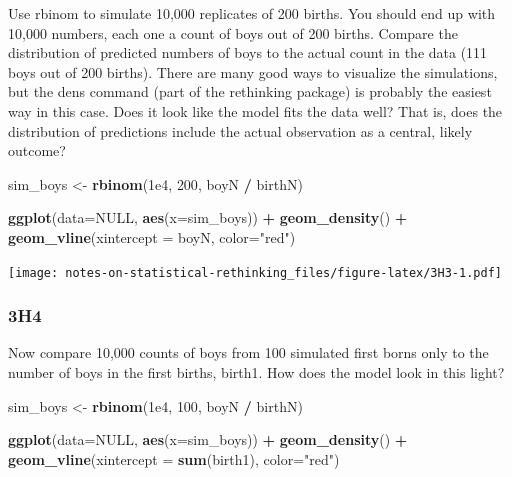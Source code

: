 \documentclass[
]{book}
\newenvironment{Shaded}{\begin{snugshade}}{\end{snugshade}}
\newcommand{\DataTypeTok}[1]{\textcolor[rgb]{0.13,0.29,0.53}{#1}}
\newcommand{\DecValTok}[1]{\textcolor[rgb]{0.00,0.00,0.81}{#1}}
\newcommand{\FloatTok}[1]{\textcolor[rgb]{0.00,0.00,0.81}{#1}}
\newcommand{\KeywordTok}[1]{\textcolor[rgb]{0.13,0.29,0.53}{\textbf{#1}}}
\newcommand{\NormalTok}[1]{#1}
\newcommand{\OperatorTok}[1]{\textcolor[rgb]{0.81,0.36,0.00}{\textbf{#1}}}
\newcommand{\OtherTok}[1]{\textcolor[rgb]{0.56,0.35,0.01}{#1}}
\newcommand{\StringTok}[1]{\textcolor[rgb]{0.31,0.60,0.02}{#1}}
\begin{document}
Use rbinom to simulate 10,000 replicates of 200 births. You should end up with 10,000 numbers, each one a count of boys out of 200 births. Compare the distribution of predicted numbers of boys to the actual count in the data (111 boys out of 200 births). There are many good ways to visualize the simulations, but the dens command (part of the rethinking package) is probably the easiest way in this case. Does it look like the model fits the data well? That is, does the distribution of predictions include the actual observation as a central, likely outcome?

\begin{Shaded}
\begin{Highlighting}[]
\NormalTok{sim\_boys \textless{}{-}}\StringTok{ }\KeywordTok{rbinom}\NormalTok{(}\FloatTok{1e4}\NormalTok{, }\DecValTok{200}\NormalTok{, boyN }\OperatorTok{/}\StringTok{ }\NormalTok{birthN)}

\KeywordTok{ggplot}\NormalTok{(}\DataTypeTok{data=}\OtherTok{NULL}\NormalTok{, }\KeywordTok{aes}\NormalTok{(}\DataTypeTok{x=}\NormalTok{sim\_boys)) }\OperatorTok{+}\StringTok{ }
\StringTok{  }\KeywordTok{geom\_density}\NormalTok{() }\OperatorTok{+}\StringTok{ }
\StringTok{  }\KeywordTok{geom\_vline}\NormalTok{(}\DataTypeTok{xintercept =}\NormalTok{ boyN, }\DataTypeTok{color=}\StringTok{"red"}\NormalTok{)}
\end{Highlighting}
\end{Shaded}

\texttt{[image: notes-on-statistical-rethinking\_files/figure-latex/3H3-1.pdf]}

\hypertarget{h4-1}{%
\subsubsection*{3H4}\label{h4-1}}

Now compare 10,000 counts of boys from 100 simulated first borns only to the number of boys in the first births, birth1. How does the model look in this light?

\begin{Shaded}
\begin{Highlighting}[]
\NormalTok{sim\_boys \textless{}{-}}\StringTok{ }\KeywordTok{rbinom}\NormalTok{(}\FloatTok{1e4}\NormalTok{, }\DecValTok{100}\NormalTok{, boyN }\OperatorTok{/}\StringTok{ }\NormalTok{birthN)}

\KeywordTok{ggplot}\NormalTok{(}\DataTypeTok{data=}\OtherTok{NULL}\NormalTok{, }\KeywordTok{aes}\NormalTok{(}\DataTypeTok{x=}\NormalTok{sim\_boys)) }\OperatorTok{+}\StringTok{ }
\StringTok{  }\KeywordTok{geom\_density}\NormalTok{() }\OperatorTok{+}\StringTok{ }
\StringTok{  }\KeywordTok{geom\_vline}\NormalTok{(}\DataTypeTok{xintercept =} \KeywordTok{sum}\NormalTok{(birth1), }\DataTypeTok{color=}\StringTok{"red"}\NormalTok{)}
\end{Highlighting}
\end{Shaded}
\end{document}
